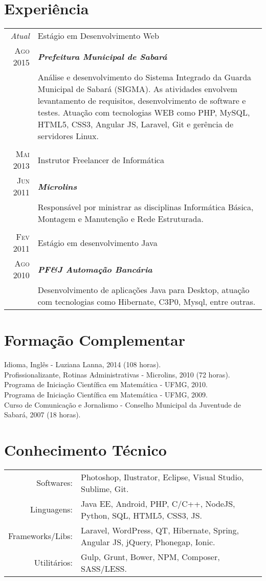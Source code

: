 \documentclass[a4paper,10pt]{article}
\begin{document}
\section{Experiência}
\begin{tabular}{r|p{13.1cm}}
	\emph{Atual} & Estágio em Desenvolvimento Web \\
	\textsc{Ago 2015}&\emph{\textbf{Prefeitura Municipal de Sabará}}\\
		 &\footnotesize{Análise e desenvolvimento do Sistema Integrado da Guarda Municipal de Sabará (SIGMA). As atividades envolvem levantamento de requisitos, desenvolvimento de software e testes. Atuação com tecnologias WEB como PHP, MySQL, HTML5, CSS3, Angular JS, Laravel, Git e gerência de servidores Linux.}\\
	\multicolumn{2}{c}{} \\
	\textsc{Mai 2013} & Instrutor Freelancer de Informática \\
		 \textsc{Jun 2011}&\emph{\textbf{Microlins}}\\
		 &\footnotesize{Responsável por ministrar as disciplinas Informática Básica, Montagem e Manutenção e Rede Estruturada.}\\
	\multicolumn{2}{c}{} \\
	\textsc{Fev 2011} & Estágio em desenvolvimento Java\\
		\textsc{Ago 2010}&\emph{\textbf{PF\&J Automação Bancária}}\\
		& \footnotesize{Desenvolvimento de aplicações Java para Desktop, atuação com tecnologias como Hibernate, C3P0, Mysql, entre outras.}
\end{tabular}

\section{Formação Complementar}
Idioma, Inglês - Luziana Lanna, \textsc{2014} (108 horas).\\
Profissionalizante, Rotinas Administrativas - Microlins, \textsc{2010} (72 horas).\\
Programa de Iniciação Científica em Matemática - UFMG, 2010.\\
Programa de Iniciação Científica em Matemática - UFMG, 2009.\\
Curso de Comunicação e Jornalismo - Conselho Municipal da Juventude de Sabará, 2007 (18 horas).

\section{Conhecimento Técnico}
\begin{tabular}{rl}
	Softwares: & Photoshop, Ilustrator, Eclipse, Visual Studio, Sublime, Git.\\
	Linguagens: & Java EE, Android, PHP, C/C++, NodeJS, Python, SQL, HTML5, CSS3, JS.\\
	Frameworks/Libs: & Laravel, WordPress, QT, Hibernate, Spring, Angular JS, jQuery, Phonegap, Ionic.\\
	Utilitários: & Gulp, Grunt, Bower, NPM, Composer, SASS/LESS.
\end{tabular}
\end{document}
